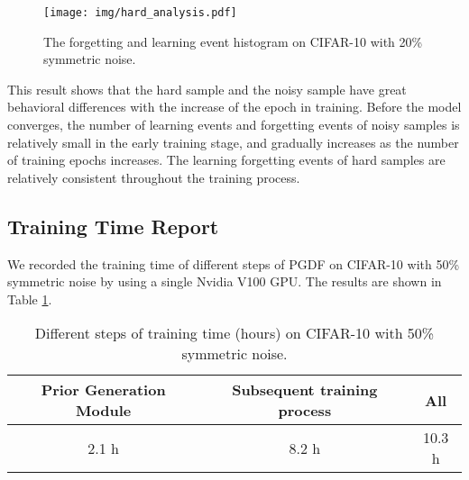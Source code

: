 \documentclass[letterpaper]{article} \usepackage{aaai22}  \usepackage{times}  \usepackage{helvet}  \usepackage{courier}  \usepackage[hyphens]{url}  \usepackage{graphicx} \urlstyle{rm} \def\UrlFont{\rm}  \usepackage{natbib}  \usepackage{caption} \DeclareCaptionStyle{ruled}{labelfont=normalfont,labelsep=colon,strut=off} \frenchspacing  \setlength{\pdfpagewidth}{8.5in}  \setlength{\pdfpageheight}{11in}  \usepackage{algorithm}
\begin{document}
\begin{figure}[hbt]
  \centering
  \texttt{[image: img/hard\_analysis.pdf]}
\caption{The forgetting and learning event histogram on CIFAR-10 with 20\% symmetric noise.} 
  \label{fig:hsa}
\end{figure}

This result shows that the hard sample and the noisy sample have great behavioral differences with the increase of the epoch in training. Before the model converges, the number of learning events and forgetting events of noisy samples is relatively small in the early training stage, and gradually increases as the number of training epochs increases. The learning forgetting events of hard samples are relatively consistent throughout the training process.

\subsection{Training Time Report}
We recorded the training time of different steps of PGDF on CIFAR-10 with 50\% symmetric noise by using a single Nvidia V100 GPU. The results are shown in Table \ref{time}.


\begin{table}[H]
\caption{Different steps of training time (hours) on CIFAR-10 with 50\% symmetric noise.}
\vskip 0.15in
\scriptsize
\centering
\begin{tabular}{@{}cc|c@{}}
\toprule
Prior Generation Module & Subsequent training process & All   \\ \midrule
2.1 h                    & 8.2 h                        & 10.3 h \\ \bottomrule
\end{tabular}
\label{time}
\vskip -0.1in
\end{table}
\end{document}
